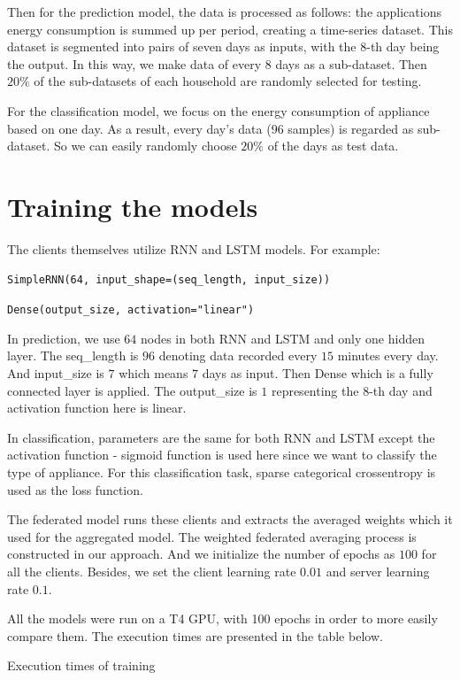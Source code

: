 \documentclass[a4paper, article, oneside, USenglish, IN5460]{memoir}
\begin{document}
Then for the prediction model, the data is processed as follows:
the applications energy consumption is summed up per period, creating a time-series dataset. This dataset is segmented into pairs of seven days as inputs, with the $8$-th day being the output. In this way, we make data of every $8$ days as a sub-dataset. Then $20\%$ of the sub-datasets of each household are randomly selected for testing.

For the classification model, we focus on the energy consumption of appliance based on one day. As a result, every day's data ($96$ samples) is regarded as sub-dataset. So we can easily randomly choose $20\%$ of the days as test data.

\section{Training the models}

The clients themselves utilize RNN and LSTM models. For example:

\texttt{SimpleRNN(64, input\_shape=(seq\_length, input\_size))}

\texttt{Dense(output\_size, activation="linear")}
\vspace{\baselineskip}

In prediction, we use $64$ nodes in both RNN and LSTM and only one hidden layer. The seq\_length is $96$ denoting data recorded every $15$ minutes every day. And input\_size is $7$ which means $7$ days as input. Then Dense which is a fully connected layer is applied. The output\_size is $1$ representing the $8$-th day and activation function here is linear.

In classification, parameters are the same for both RNN and LSTM except the activation function - sigmoid function is used here since we want to classify the type of appliance. For this classification task, sparse categorical crossentropy is used as the loss function.

The federated model runs these clients and extracts the averaged weights which it used for the aggregated model. The weighted federated averaging process is constructed in our approach. And we initialize the number of epochs as $100$ for all the clients. Besides, we set the client learning rate $0.01$ and server learning rate $0.1$.

All the models were run on a T4 GPU, with 100 epochs in order to more easily compare them. The execution times are presented in the table below.


\begin{Table}
  \centering
    
  \caption{\label{table} Execution times of training}
\end{Table}
\end{document}
